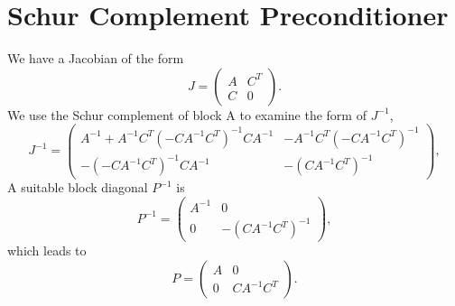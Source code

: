 \documentclass{article}[10pt]
\begin{document}
\section{Schur Complement Preconditioner}

We have a Jacobian of the form
\begin{equation}
  J = \left( \begin{array}{cc}
    A & C^T \\
    C & 0
  \end{array} \right).
\end{equation}
We use the Schur complement of block A to examine the form of $J^{-1}$,
\begin{equation}
  J^{-1} = \left( \begin{array}{cc}
    A^{-1}+A^{-1} C^{T}(-C A^{-1} C^{T})^{-1} C A^{-1} & 
    -A^{-1}C^{T}(-C A^{-1} C^{T})^{-1} \\
    -(-C A^{-1} C^{T})^{-1} C A^{-1} & -(C A^{-1} C^T)^{-1}
  \end{array} \right),
\end{equation}
A suitable block diagonal $P^{-1}$ is
\begin{equation}
  P^{-1} = \left( \begin{array}{cc}
    A^{-1} & 0 \\
    0 & -(C A^{-1} C^T)^{-1}
  \end{array} \right),
\end{equation}
which leads to
\begin{equation}
  P = \left( \begin{array}{cc}
    A & 0 \\
    0 & C A^{-1} C^T
  \end{array} \right).
\end{equation}
\end{document}
